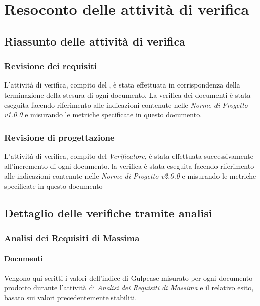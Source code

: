 \appendix
\section{Resoconto delle attività di verifica}
	\subsection{Riassunto delle attività di verifica}
	\subsubsection{Revisione dei requisiti}
	L'attività di verifica, compito del \emph{}, è stata effettuata in corrispondenza della terminazione della stesura di ogni documento. La verifica dei documenti è stata eseguita facendo riferimento alle indicazioni contenute nelle \emph{Norme di Progetto v1.0.0} e misurando le metriche specificate in questo documento.
	\subsubsection{Revisione di progettazione}
	L'attività di verifica, compito del \emph{Verificatore}, è stata effettuata successivamente all'incremento di ogni documento. la verifica è stata eseguita facendo riferimento alle indicazioni contenute nelle \emph{Norme di Progetto v2.0.0} e misurando le metriche specificate in questo documento	
	
	\subsection{Dettaglio delle verifiche tramite analisi}
	\subsubsection{Analisi dei Requisiti di Massima}
	\paragraph{Documenti} \Spazio
	Vengono qui scritti i valori dell'indice di Gulpease misurato per ogni documento prodotto durante l'attività di \textit{Analisi dei Requisiti di Massima} e il relativo esito, basato sui valori precedentemente stabiliti.
	
